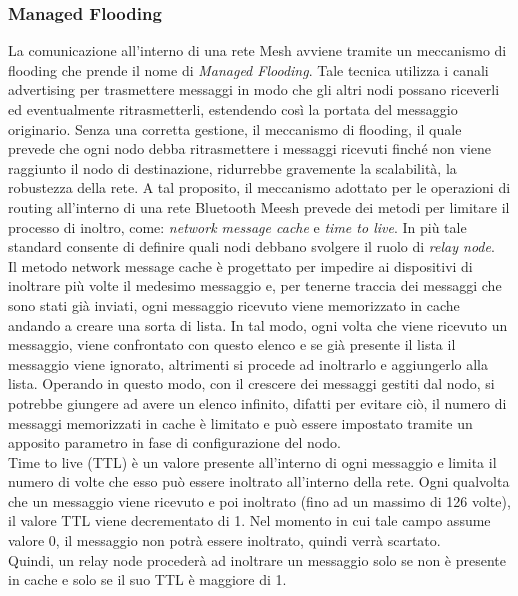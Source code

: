 \subsubsection{Managed Flooding}
\label{subsub:managed_flooding}
La comunicazione all'interno di una rete Mesh avviene tramite un meccanismo di flooding che prende il nome di \textit{Managed Flooding}. Tale tecnica utilizza i canali advertising per trasmettere messaggi in modo che gli altri nodi possano riceverli ed eventualmente ritrasmetterli, estendendo così la portata del messaggio originario. 
Senza una corretta gestione, il meccanismo di flooding, il quale prevede che ogni nodo debba ritrasmettere i messaggi ricevuti finché non viene raggiunto il nodo di destinazione, ridurrebbe gravemente la scalabilità, la robustezza della rete. %
A tal proposito, il meccanismo adottato per le operazioni di routing all'interno di una rete Bluetooth Meesh prevede dei metodi per limitare il processo di inoltro, come: \textit{network message cache} e \textit{time to live}. In più tale standard consente di definire quali nodi debbano svolgere il ruolo di \textit{relay node}.\\
Il metodo network message cache è progettato per impedire ai dispositivi di inoltrare più volte il medesimo messaggio e, per tenerne traccia dei messaggi che sono stati già inviati, ogni messaggio ricevuto viene memorizzato in cache andando a creare una sorta di lista. In tal modo, ogni volta che viene ricevuto un messaggio, viene confrontato con questo elenco e se già presente il lista il messaggio viene ignorato, altrimenti si procede ad inoltrarlo e aggiungerlo alla lista. Operando in questo modo, con il crescere dei messaggi gestiti dal nodo, si potrebbe giungere ad avere un elenco infinito, difatti per evitare ciò, il numero di messaggi memorizzati in cache è limitato e può essere impostato tramite un apposito parametro in fase di configurazione del nodo.\\
Time to live (TTL) è un valore presente all'interno di ogni messaggio e limita il numero di volte che esso può essere inoltrato all'interno della rete. Ogni qualvolta che un messaggio viene ricevuto e poi inoltrato (fino ad un massimo di 126 volte), il valore TTL viene decrementato di 1. Nel momento in cui tale campo assume valore 0, il messaggio non potrà essere inoltrato, quindi verrà scartato.\\
Quindi, un relay node procederà ad inoltrare un messaggio solo se non è presente in cache e solo se il suo TTL è maggiore di 1.

